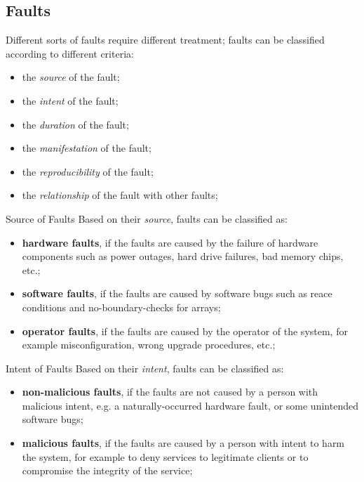 \documentclass[11pt, a4paper]{article}
\begin{document}
\subsection{Faults}\label{sub:faults} %
Different sorts of faults require different treatment; faults can be classified according to different criteria:
\begin{itemize}
    \item the \textit{source} of the fault;
    \item the \textit{intent} of the fault;
    \item the \textit{duration} of the fault;
    \item the \textit{manifestation} of the fault;
    \item the \textit{reproducibility} of the fault;
    \item the \textit{relationship} of the fault with other faults;
\end{itemize}
\begin{definition}{Source of Faults}{}
    Based on their \textit{source}, faults can be classified as:
    \begin{itemize}
        \item \textbf{hardware faults}, if the faults are caused by the failure of hardware components such as power outages, hard drive failures, bad memory chips, etc.;
        \item \textbf{software faults}, if the faults are caused by software bugs such as reace conditions and no-boundary-checks for arrays;
        \item \textbf{operator faults}, if the faults are caused by the operator of the system, for example misconfiguration, wrong upgrade procedures, etc.;
\end{itemize}
\end{definition}
\begin{definition}{Intent of Faults}{}
    Based on their \textit{intent}, faults can be classified as:
    \begin{itemize}
        \item \textbf{non-malicious faults}, if the faults are not caused by a person with malicious intent, e.g. a naturally-occurred hardware fault, or some unintended software bugs; 
        \item \textbf{malicious faults}, if the faults are caused by a person with intent to harm the system, for example to deny services to legitimate clients or to compromise the integrity of the service;
\end{itemize}
\end{definition}
\end{document}
